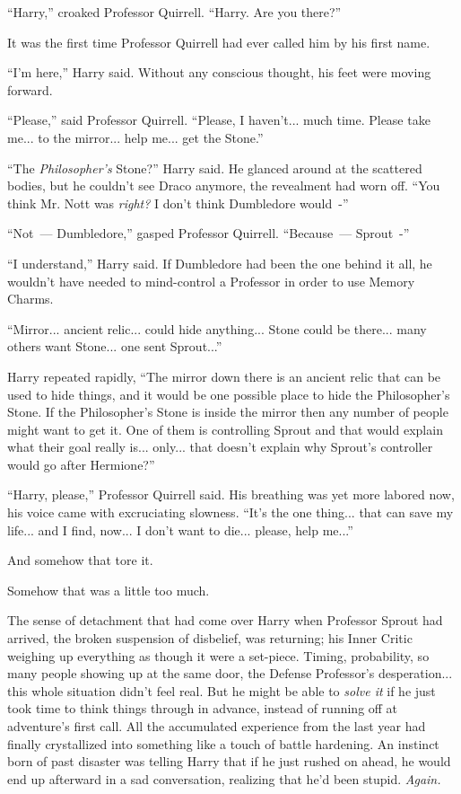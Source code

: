 ``Harry,'' croaked Professor Quirrell. ``Harry. Are you there?''

It was the first time Professor Quirrell had ever called him by his first name.

``I'm here,'' Harry said. Without any conscious thought, his feet were moving forward.

``Please,'' said Professor Quirrell. ``Please, I haven't... much time. Please take me... to the mirror... help me... get the Stone.''

``The \emph{Philosopher's} Stone?'' Harry said. He glanced around at the scattered bodies, but he couldn't see Draco anymore, the revealment had worn off. ``You think Mr. Nott was \emph{right?} I don't think Dumbledore would~-''

``Not~--- Dumbledore,'' gasped Professor Quirrell. ``Because~--- Sprout~-''

``I understand,'' Harry said. If Dumbledore had been the one behind it all, he wouldn't have needed to mind-control a Professor in order to use Memory Charms.

``Mirror... ancient relic... could hide anything... Stone could be there... many others want Stone... one sent Sprout...''

Harry repeated rapidly, ``The mirror down there is an ancient relic that can be used to hide things, and it would be one possible place to hide the Philosopher's Stone. If the Philosopher's Stone is inside the mirror then any number of people might want to get it. One of them is controlling Sprout and that would explain what their goal really is... only... that doesn't explain why Sprout's controller would go after Hermione?''

``Harry, please,'' Professor Quirrell said. His breathing was yet more labored now, his voice came with excruciating slowness. ``It's the one thing... that can save my life... and I find, now... I don't want to die... please, help me...''

And somehow that tore it.

Somehow that was a little too much.

The sense of detachment that had come over Harry when Professor Sprout had arrived, the broken suspension of disbelief, was returning; his Inner Critic weighing up everything as though it were a set-piece. Timing, probability, so many people showing up at the same door, the Defense Professor's desperation... this whole situation didn't feel real. But he might be able to \emph{solve it} if he just took time to think things through in advance, instead of running off at adventure's first call. All the accumulated experience from the last year had finally crystallized into something like a touch of battle hardening. An instinct born of past disaster was telling Harry that if he just rushed on ahead, he would end up afterward in a sad conversation, realizing that he'd been stupid. \emph{Again.}

